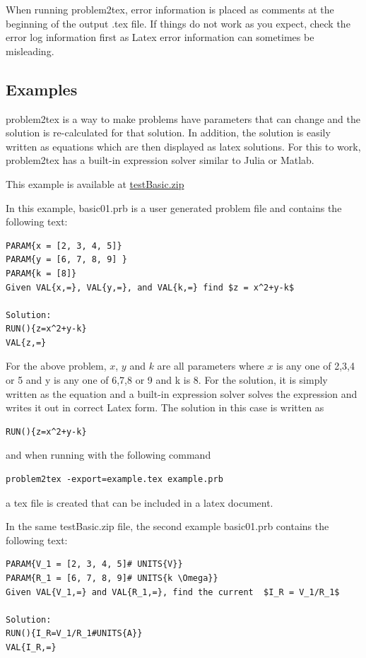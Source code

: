 \documentclass{article}
\begin{document}
When running problem2tex, error information is placed as comments at the beginning of the output .tex file.  If things do not work as you expect, check the error log information first as Latex error information can sometimes be misleading.

\subsection{Examples}

problem2tex is a way to make problems have parameters that can change and the solution is re-calculated for that solution.  In addition, the solution is easily written as equations which are then displayed as latex solutions.  For this to work, problem2tex has a built-in expression solver similar to Julia or Matlab.   

This example is available at \href{https://www.icewire.ca/examples/testBasic.zip}{testBasic.zip}

In this example, basic01.prb is a user generated problem file and contains the following text:
\begin{lstlisting}
PARAM{x = [2, 3, 4, 5]}
PARAM{y = [6, 7, 8, 9] }
PARAM{k = [8]}
Given VAL{x,=}, VAL{y,=}, and VAL{k,=} find $z = x^2+y-k$

Solution:
RUN(){z=x^2+y-k}
VAL{z,=}
\end{lstlisting}

For the above problem, $x$, $y$ and $k$ are all parameters where $x$ is any one of 2,3,4 or 5 and
y is any one of 6,7,8 or 9 and k is 8.  For the solution, it is simply written as the equation and a built-in expression solver solves the expression and writes it out in correct Latex form.  The solution in this case is written as 

\begin{lstlisting}
RUN(){z=x^2+y-k}
\end{lstlisting}


and when running with the following command\\
\begin{lstlisting}
problem2tex -export=example.tex example.prb
\end{lstlisting}
a tex file is created that can be included in a latex document.

In the same testBasic.zip file, the second example basic01.prb contains the following text:
\begin{lstlisting}
PARAM{V_1 = [2, 3, 4, 5]# UNITS{V}}
PARAM{R_1 = [6, 7, 8, 9]# UNITS{k \Omega}}
Given VAL{V_1,=} and VAL{R_1,=}, find the current  $I_R = V_1/R_1$

Solution:
RUN(){I_R=V_1/R_1#UNITS{A}}
VAL{I_R,=}
\end{lstlisting}
 
\end{document}
